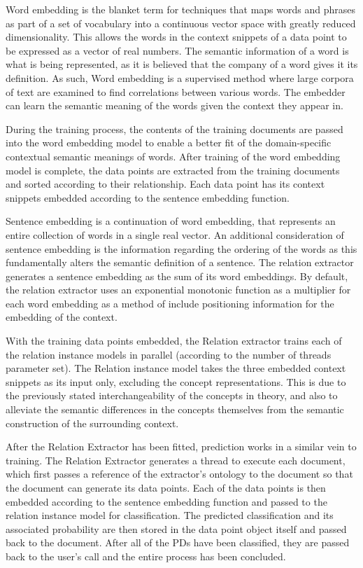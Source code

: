 \documentclass[11pt]{article} %
\begin{document}
Word embedding is the blanket term for techniques that maps words and phrases as part of a set of vocabulary into a continuous vector space with greatly reduced dimensionality. This allows the words in the context snippets of a data point to be expressed as a vector of real numbers. The semantic information of a word is what is being represented, as it is believed that the company of a word gives it its definition. As such, Word embedding is a supervised method where large corpora of text are examined to find correlations between various words. The embedder can learn the semantic meaning of the words given the context they appear in.

During the training process, the contents of the training documents are passed into the word embedding model to enable a better fit of the domain-specific contextual semantic meanings of words. After training of the word embedding model is complete, the data points are extracted from the training documents and sorted according to their relationship. Each data point has its context snippets embedded according to the sentence embedding function.

Sentence embedding is a continuation of word embedding, that represents an entire collection of words in a single real vector. An additional consideration of sentence embedding is the information regarding the ordering of the words as this fundamentally alters the semantic definition of a sentence. The relation extractor generates a sentence embedding as the sum of its word embeddings. By default, the relation extractor uses an exponential monotonic function as a multiplier for each word embedding as a method of include positioning information for the embedding of the context.

With the training data points embedded, the Relation extractor trains each of the relation instance models in parallel (according to the number of threads parameter set). The Relation instance model takes the three embedded context snippets as its input only, excluding the concept representations. This is due to the previously stated interchangeability of the concepts in theory, and also to alleviate the semantic differences in the concepts themselves from the semantic construction of the surrounding context.

After the Relation Extractor has been fitted, prediction works in a similar vein to training. The Relation Extractor generates a thread to execute each document, which first passes a reference of the extractor's ontology to the document so that the document can generate its data points. Each of the data points is then embedded according to the sentence embedding function and passed to the relation instance model for classification. The predicted classification and its associated probability are then stored in the data point object itself and passed back to the document. After all of the PDs have been classified, they are passed back to the user's call and the entire process has been concluded.
\end{document}
